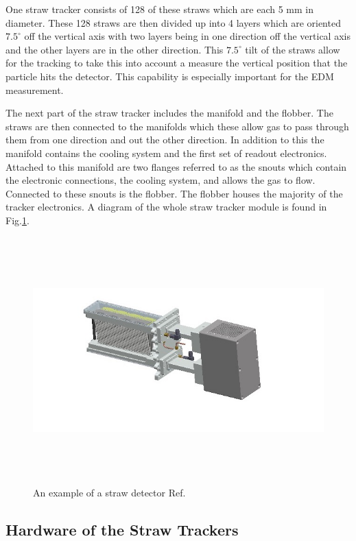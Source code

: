\documentclass[./Thesis]{subfiles}
\begin{document}
	 One straw tracker consists of 128 of these straws which are each 5 mm in diameter.  These 128 straws are then divided up into 4 layers which are oriented $7.5^\circ$ off the vertical axis with two layers being in one direction off the vertical axis and the other layers are in the other direction.  This $7.5^\circ$ tilt of the straws allow for the tracking to take this into account a measure the vertical position that the particle hits the detector.  This capability is especially important for the EDM measurement. 
	 
	 The next part of the straw tracker includes the manifold and the flobber.  The straws are then connected to the manifolds which these allow gas to pass through them from one direction and out the other direction.  In addition to this the manifold contains the cooling system and the first set of readout electronics.  Attached to this manifold are two flanges referred to as the snouts which contain the electronic connections, the cooling system, and allows the gas to flow.  Connected to these snouts is the flobber.  The flobber houses the majority of the tracker electronics.  A diagram of the whole straw tracker module is found in Fig.\ref{fig:StrawDetector}.

	
\begin{figure}
	\centerline{\includegraphics[height=95mm]{StrawDetector.jpg}}
	\caption[ A Straw Detector]{ An example of a straw detector Ref. \cite{TDR}
	}
	\label{fig:StrawDetector}
\end{figure} 

\subsection{Hardware of the Straw Trackers}
\end{document}
